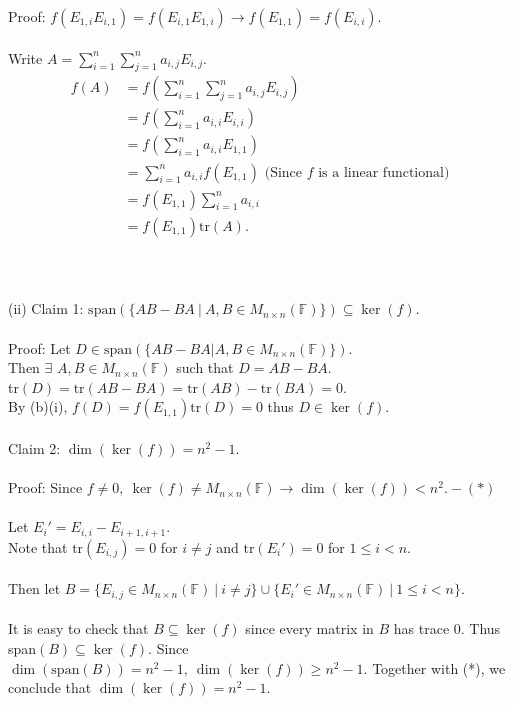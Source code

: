 \documentclass{article}
\begin{document}
Proof: $f(E_{1,i}E_{i,1}) = f(E_{i,1}E_{1,i}) \to f(E_{1,1}) = f(E_{i,i}).$\\\\
Write $A = \sum\limits_{i=1}^n \sum\limits_{j=1}^n a_{i,j}E_{i,j}.$\begin{align*}
f(A) &= f(\sum\limits_{i=1}^n \sum\limits_{j=1}^n a_{i,j}E_{i,j})\\&=f(\sum\limits_{i=1}^n a_{i,i}E_{i,i})\\&=f(\sum\limits_{i=1}^n a_{i,i}E_{1,1})\\&=\sum\limits_{i=1}^n a_{i,i}f(E_{1,1})\text{\ \ (Since $f$ is a linear functional)}\\&= f(E_{1,1})\sum\limits_{i=1}^n a_{i,i}
\\&=f(E_{1,1})\text{tr}(A).\end{align*}
\\\\\\(ii) Claim 1: $\text{span}(\{AB-BA\ |\ A,B\in M_{n\times n}(\mathbb{F})\}) \subseteq \ker(f)$.
\\\\Proof: Let $D \in \text{span}(\{AB-BA|A,B\in M_{n\times n}(\mathbb{F})\})$.\\ Then $\exists$ $A,B\in M_{n\times n}(\mathbb{F})$ such that $D = AB - BA.$\\tr$(D) = \text{tr}(AB-BA) = \text{tr}(AB) - \text{tr}(BA) = 0.$\\By (b)(i), $f(D) = f(E_{1,1})\text{tr}(D) = 0$ thus $D\in \ker(f).$ \\\\
Claim 2: $\dim(\ker(f)) = n^2-1.$\\\\
Proof: Since $f\neq0,\ \ker(f) \neq M_{n\times n}(\mathbb{F}) \to \dim(\ker(f)) < n^2. -(*)$ \\\\
Let $E_i' = E_{i,i} - E_{i+1,i+1}.$\\
Note that $\text{tr}(E_{i,j}) = 0$ for $i \neq j$ and $\text{tr}(E_{i}') = 0$ for $1\leq i < n.$\\\\
Then let $B = \{E_{i,j}\in M_{n\times n} (\mathbb{F})\ |\ i\neq j \}\cup \{E_i' \in M_{n\times n}(\mathbb{F}) \ |\ 1\leq i < n\}.$\\\\
It is easy to check that $B\subseteq \ker(f)$ since every matrix in $B$ has trace 0. Thus span$(B) \subseteq \ker(f).$  Since $\dim(\text{span}(B)) = n^2 -1,\ \dim(\ker(f)) \geq n^2 - 1.$ Together with (*), we conclude that $\dim(\ker(f)) = n^2 -1.$\\\\
\end{document}
